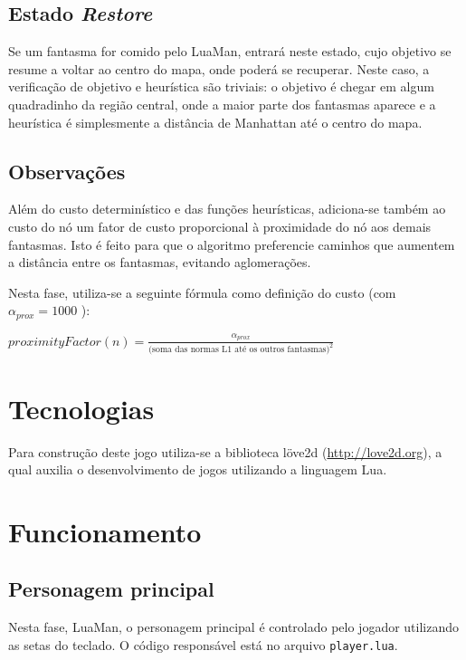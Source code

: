 \documentclass[a4paper]{scrartcl}
\begin{document}
\subsection{Estado \textit{Restore}}

Se um fantasma for comido pelo LuaMan, entrará neste estado, cujo objetivo se resume a voltar ao
centro do mapa, onde poderá se recuperar. Neste caso, a verificação de objetivo e heurística são triviais: o objetivo é chegar em algum quadradinho da região central, onde a maior parte dos fantasmas aparece e a heurística é simplesmente a distância de Manhattan até o centro do mapa.

\subsection{Observações}

Além do custo determinístico e das funções heurísticas, adiciona-se também ao custo do
nó um fator de custo proporcional à proximidade do nó aos demais fantasmas. Isto é feito
para que o algoritmo preferencie caminhos que aumentem a distância entre os fantasmas, evitando
aglomerações.

Nesta fase, utiliza-se a seguinte fórmula como definição do custo (com $\alpha_{prox} = 1000$ ):

$proximityFactor(n) =  \frac{\alpha_{prox}}{\text{{(soma das normas L1 até os outros fantasmas})}^2}$

\section{Tecnologias}

Para construção deste jogo utiliza-se a biblioteca löve2d (\url{http://love2d.org}),
a qual auxilia o desenvolvimento de jogos utilizando a linguagem Lua.

\section{Funcionamento}

\subsection{Personagem principal}

Nesta fase, LuaMan, o personagem principal é controlado pelo jogador utilizando as setas do teclado.
O código responsável está no arquivo \texttt{player.lua}.
\end{document}
